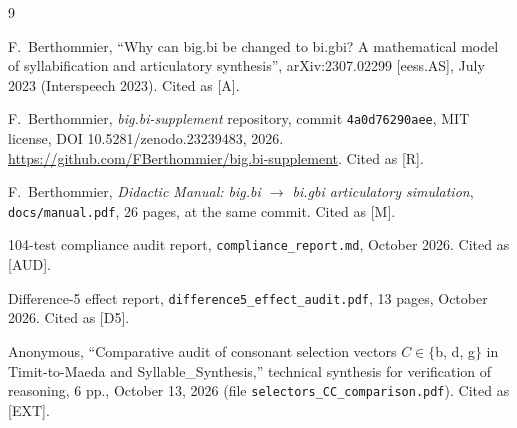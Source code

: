 \documentclass[11pt,letterpaper]{article}
\newcommand{\code}[1]{\texttt{#1}}
\begin{document}
\begin{thebibliography}{9}\small

F.~Berthommier, ``Why can big.bi be changed to bi.gbi? A mathematical model
of syllabification and articulatory synthesis'', arXiv:2307.02299 [eess.AS],
July 2023 (Interspeech 2023). Cited as [A].

F.~Berthommier, \emph{big.bi-supplement} repository, commit
\code{4a0d76290aee}, MIT license, DOI 10.5281/zenodo.23239483, 2026.
\url{https://github.com/FBerthommier/big.bi-supplement}. Cited as [R].

F.~Berthommier, \emph{Didactic Manual: big.bi $\to$ bi.gbi articulatory
simulation}, \code{docs/manual.pdf}, 26 pages, at the same commit. Cited as
[M].

104-test compliance audit report, \code{compliance\_report.md}, October 2026.
Cited as [AUD].

Difference-5 effect report, \code{difference5\_effect\_audit.pdf}, 13 pages,
October 2026. Cited as [D5].

Anonymous, ``Comparative audit of consonant selection vectors
$C \in \{$b, d, g$\}$ in Timit-to-Maeda and Syllable\_Synthesis,''
technical synthesis for verification of reasoning, 6 pp., October 13, 2026
(file \code{selectors\_CC\_comparison.pdf}). Cited as [EXT].

\end{thebibliography}
\end{document}

